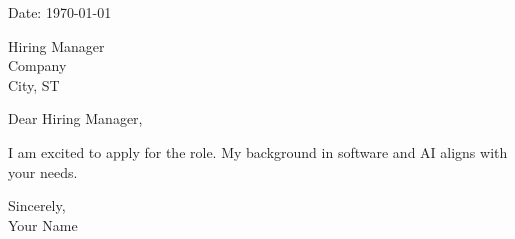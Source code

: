 \documentclass[11pt]{article}
\begin{document}
\noindent Date: \today

\vspace{10pt}
Hiring Manager \\
Company \\
City, ST

\vspace{10pt}
Dear Hiring Manager,

I am excited to apply for the role. My background in software and AI aligns with your needs.

Sincerely, \\
Your Name
\end{document}
